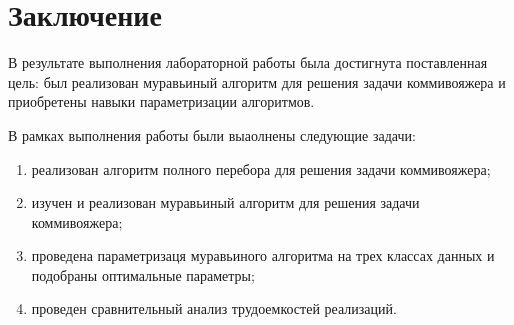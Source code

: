 \chapter*{Заключение}

В результате выполнения лабораторной работы была достигнута поставленная цель: был реализован муравьиный алгоритм для решения задачи коммивояжера и приобретены навыки параметризации алгоритмов.


В рамках выполнения работы были выаолнены следующие задачи: 
\begin{enumerate}[label={\arabic*)}]
	\item реализован алгоритм полного перебора для решения задачи коммивояжера;
	\item изучен и реализован муравьиный алгоритм для решения задачи коммивояжера;
	\item проведена параметризаця муравьиного алгоритма на трех классах данных и подобраны оптимальные параметры;
	\item проведен сравнительный анализ трудоемкостей реализаций.


\end{enumerate}



